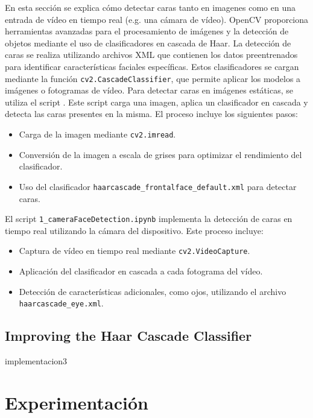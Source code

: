 \documentclass[a4paper]{article}
\begin{document}
En esta sección se explica cómo detectar caras tanto en imagenes como en una entrada de vídeo en tiempo real (e.g. una cámara de vídeo).
OpenCV proporciona herramientas avanzadas para el procesamiento de imágenes y la detección de objetos mediante el uso de clasificadores en cascada de Haar.\newline
La detección de caras se realiza utilizando archivos XML que contienen los datos preentrenados para identificar características faciales específicas. Estos clasificadores se cargan mediante la función \texttt{cv2.CascadeClassifier}, que permite aplicar los modelos a imágenes o fotogramas de vídeo.
Para detectar caras en imágenes estáticas, se utiliza el script \texttt{}. Este script carga una imagen, aplica un clasificador en cascada y detecta las caras presentes en la misma. El proceso incluye los siguientes pasos:

\begin{itemize}
    \item Carga de la imagen mediante \texttt{cv2.imread}.
    \item Conversión de la imagen a escala de grises para optimizar el rendimiento del clasificador.
    \item Uso del clasificador \texttt{haarcascade\_frontalface\_default.xml} para detectar caras.
\end{itemize}

El script \texttt{1\_cameraFaceDetection.ipynb} implementa la detección de caras en tiempo real utilizando la cámara del dispositivo. Este proceso incluye:
\begin{itemize}
    \item Captura de vídeo en tiempo real mediante \texttt{cv2.VideoCapture}.
    \item Aplicación del clasificador en cascada a cada fotograma del vídeo.
    \item Detección de características adicionales, como ojos, utilizando el archivo \texttt{haarcascade\_eye.xml}.
\end{itemize}

\subsection{Improving the Haar Cascade Classifier}

implementacion3

\section{Experimentación}
\end{document}
